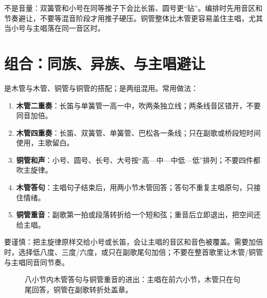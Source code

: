 不是音量：双簧管和小号在同等推子下会比长笛、圆号更“钻”。编排时先用音区和节奏避让，不要等混音阶段才用推子硬压。铜管整体比木管更容易盖住主唱，尤其当小号与主唱落在同一音区时。

\section{组合：同族、异族、与主唱避让}
\label{sec:winds-combination}

是木管与木管、铜管与铜管的搭配；是两组混用。常用做法：

\begin{enumerate}
\item \textbf{木管二重奏}：长笛与单簧管一高一中，吹两条独立线；两条线音区错开，不要同音加倍。
\item \textbf{木管四重奏}：长笛、双簧管、单簧管、巴松各一条线；只在副歌或桥段短时间使用，主歌留白。
\item \textbf{铜管和声}：小号、圆号、长号、大号按“高—中—中低—低”排列；不要四件都吹主旋律。
\item \textbf{木管答句}：主唱句子结束后，用两小节木管回答；答句不重复主唱原句，只接住情绪。
\item \textbf{铜管重音}：副歌第一拍或段落转折给一个短和弦；重音后立即退出，把空间还给主唱。
\end{enumerate}

要谨慎：把主旋律原样交给小号或长笛，会让主唱的音区和音色被覆盖。需要加倍时，选择低八度、三度/六度，或只在副歌尾句加倍；不要在整首歌里让木管/铜管与主唱同音同节奏。

\begin{figure}[htbp]
  \centering
  \caption{八小节内木管答句与铜管重音的进出：主唱在前六小节，木管只在句尾回答，铜管在副歌转折处盖章。}
  \label{fig:winds-brass-entry}
\end{figure}

